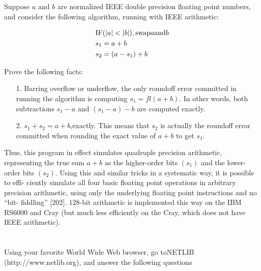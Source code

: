 \documentclass[a4paper]{ctexart}
\newcommand{\pf}{\textbf{\color{pink}{proof:}}}
\begin{document}
\pf

\subsection{}
Suppose $a$ and $b$ are normalized IEEE double precision floating point numbers, and consider the following algorithm, running
with IEEE arithmetic:

\begin{align*}
    &\text{IF} (\abs{a}<\abs{b}), \text{swap} a \text{and} b\\
    &s_1 = a+ b\\
    &s_2 = (a-s_1) + b
\end{align*}

Prove the following facts:
\begin{itemize}
    \item[1.] Barring overflow or underflow, the only roundoff error committed in running the algorithm is computing $s_1 = fl(a + b)$. In other words, both
    subtractions $s_1 - a$ and $(s_1 - a) - b$ are computed exactly.
    \item[2.] $s_1 +s_2 = a+b$,exactly. This means that $s_2$ is actually the roundoff error
    committed when rounding the exact value of $a + b$ to get $s_1$.
\end{itemize}
Thus, this program in effect simulates quadruple precision arithmetic, representing the true sum $a + b$ as the higher-order bits $(s_1)$ and the lower-order
bits $(s_2)$.
Using this and similar tricks in a systematic way, it is possible to effi-
ciently simulate all four basic floating point operations in arbitrary precision
arithmetic, using only the underlying floating point instructions and no “bit-
fiddling” [202]. $128$-bit arithmetic is implemented this way on the IBM RS6000
and Cray (but much less efficiently on the Cray, which does not have IEEE
arithmetic).

\pf

\section{}

\subsection{}
Using  your  favorite  World  Wide  Web  browser,  go toNETLIB (http://www.netlib.org), and answer the following questions
\end{document}
